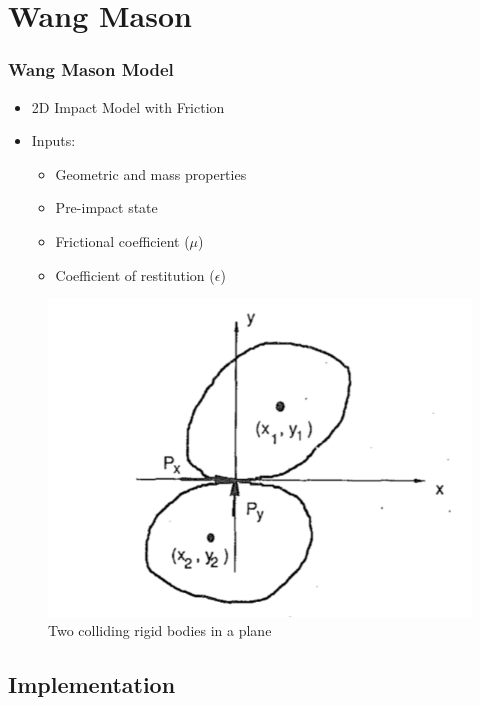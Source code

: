 \section{Wang Mason}

\begin{frame}
\frametitle{Wang Mason Model \cite{wangmason}}
\begin{itemize}
    \item 2D Impact Model with Friction
    \item Inputs:
    \begin{itemize}
        \item Geometric and mass properties
        \item Pre-impact state
        \item Frictional coefficient ($\mu$)
        \item Coefficient of restitution ($\epsilon$)
    \end{itemize}
\end{itemize}   
\begin{figure}
    \centering
    \includegraphics[scale=0.6]{figures/WangPlot.png}
    \caption{Two colliding rigid bodies in a plane\cite{wangmason}}
    \label{fig:WangPlot}
\end{figure}

\end{frame}


\subsection{Implementation}

